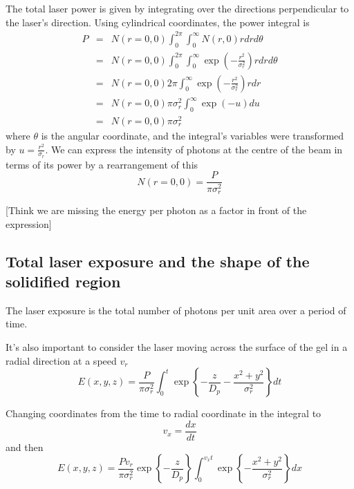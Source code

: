 The total laser power is given by integrating over the directions perpendicular to the laser's direction. Using cylindrical coordinates, the power integral is 
\begin{eqnarray}
 P & = & N\left(r=0, 0 \right) \int_{0}^{2\pi} \int_{0}^{\infty} N\left(r, 0 \right) r dr d\theta \\
   & = & N\left(r=0, 0 \right) \int_{0}^{2\pi} \int_{0}^{\infty} \exp\left( - \frac{r^{2}}{\sigma_{r}^{2}} \right) r dr d\theta \\
   & = & N\left(r=0, 0 \right) 2\pi \int_{0}^{\infty} \exp\left( - \frac{r^{2}}{\sigma_{r}^{2}} \right) r dr \\
   & = & N\left(r=0, 0 \right) \pi \sigma_{r}^{2} \int_{0}^{\infty} \exp\left( - u  \right) du \\
   & = & N\left(r=0, 0 \right) \pi \sigma_{r}^{2}
\end{eqnarray}
where $\theta$ is the angular coordinate, and the integral's variables were transformed by $u =  \frac{r^{2}}{\sigma_{r}}$. We can express the intensity of photons at the centre of the beam in terms of its power by a rearrangement of this
\begin{equation}
   N\left(r=0, 0 \right)  = \frac{P}{\pi \sigma_{r}^{2}}
\end{equation}

[Think we are missing the energy per photon as a factor in front of the expression]

\subsection{Total laser exposure and the shape of the solidified region }

The laser exposure is the total number of photons per unit area over a period of time. 

It's also important to consider the laser moving across the surface of the gel in a radial direction at a speed $v_{r}$
\begin{equation}
 E\left(x,y,z\right) = \frac{P}{\pi \sigma_{r}^{2}}  \int_{0}^{t} \exp \left\{ - \frac{z}{D_{p}} - \frac{x^{2}+y^{2}}{\sigma_{r}^{2}}  \right\} dt 
\end{equation}

Changing coordinates from the time to radial coordinate in the integral to 
\begin{equation}
 v_{x} = \frac{dx}{dt}
\end{equation}
and then 
\begin{equation}
 E\left(x,y,z\right) = \frac{Pv_{r}}{\pi \sigma_{r}^{2}}  \exp \left\{ - \frac{z}{D_{p}}\right\} \int_{0}^{v_{x} t}  \exp \left\{ - \frac{x^{2}+y^{2}}{\sigma_{r}^{2}}  \right\} dx 
\end{equation}


